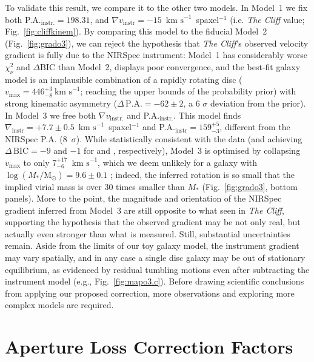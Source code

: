 \documentclass[fleqn,usenatbib]{mnras}
\newcommand{\Msun}{\ensuremath{\mathrm{M}_\odot}\xspace}
\newcommand{\Halpha}{\text{H\textalpha}\xspace}
\newcommand{\kms}{\ensuremath{\text{km s}^{-1}}\xspace}
\newcommand{\OIII}{\forbiddenEL[O][iii]}
\newcommand{\cliff}{\textit{The Cliff}\xspace}
\begin{document}
To validate this result, we compare it to the other two models. In Model~1 we fix both P.A.$_\mathrm{instr.}=198.31$\textdegree, and $\nabla v_\mathrm{instr}=-15$~\kms~spaxel$^{-1}$ (i.e. \cliff value; Fig.~\ref{fig:cliffkinem}).
By comparing this model to the fiducial Model~2 (Fig.~\ref{fig:grado3}), we can reject the hypothesis that \cliff's observed velocity gradient is fully due to the
NIRSpec instrument: Model~1 has considerably worse $\chi^2_\nu$ and $\Delta\text{BIC}$ than Model~2, displays poor convergence, and the best-fit galaxy model is an implausible combination of a rapidly rotating disc ($v_\mathrm{max}=446_{-8}^{+3}~\kms$; reaching the upper bounds of the probability prior) with strong kinematic asymmetry ($\Delta\,\text{P.A.}=-62\pm2$\textdegree, a 6 $\sigma$ deviation from the prior).
In Model~3 we free both $\nabla v_\mathrm{instr.}$ and P.A.$_\mathrm{instr.}$. 
This model finds $\nabla_\mathrm{instr} = +7.7\pm0.5$~\kms~spaxel$^{-1}$ and P.A.$_\mathrm{instr}=159_{-3}^{+5}$\textdegree, different from the NIRSpec P.A. (8~$\sigma$).
While statistically consistent with the data (and achieving $\Delta\,\text{BIC}=-9$ and $-1$ for \OIII and \Halpha, respectively), Model~3 is optimised by collapsing $v_\mathrm{max}$ to only $7_{-6}^{+17}$~\kms, which we deem unlikely for a galaxy with $\log(M_\ast/\Msun)=9.6\pm0.1$ \citep{Muzzin2025}; indeed, the inferred rotation is so small that the implied virial mass is over 30 times smaller than $M_\ast$ (Fig.~\ref{fig:grado3}, bottom panels).
More to the point, the magnitude and orientation of the NIRSpec gradient inferred from Model~3 are still opposite to what seen in \cliff, supporting the hypothesis that the observed gradient may be not only real, but actually even stronger than what is measured. 
Still, substantial uncertainties remain. 
Aside from the limits of our toy galaxy model, the instrument gradient may vary spatially, and in any case a single disc galaxy may be out of stationary equilibrium, as evidenced by residual tumbling motions even after subtracting the instrument model (e.g., Fig.~\ref{fig:mapo3.c}). 
Before drawing scientific conclusions from applying our proposed correction, more observations and exploring more complex models are required.

\section{Aperture Loss Correction Factors}\label{sec:ALC}
\end{document}
